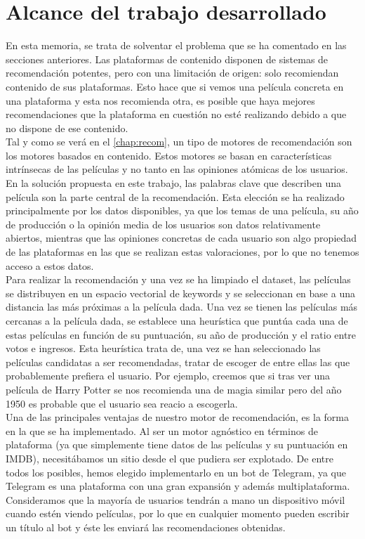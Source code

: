 \section{Alcance del trabajo desarrollado}\label{sec:trabajodesarrollado}

En esta memoria, se trata de solventar el problema que se ha comentado en las secciones anteriores. Las plataformas de contenido disponen de sistemas de recomendación potentes, pero con una limitación de origen: solo recomiendan contenido de sus plataformas. Esto hace que si vemos una película concreta en una plataforma y esta nos recomienda otra, es posible que haya mejores recomendaciones que la plataforma en cuestión no esté realizando debido a que no dispone de ese contenido.\\ 

Tal y como se verá en el \autoref{chap:recom}, un tipo de motores de recomendación son los motores basados en contenido. Estos motores se basan en características intrínsecas de las películas y no tanto en las opiniones atómicas de los usuarios. En la solución propuesta en este trabajo, las palabras clave que describen una película son la parte central de la recomendación. Esta elección se ha realizado principalmente por los datos disponibles, ya que los temas de una película, su año de producción o la opinión media de los usuarios son datos relativamente abiertos, mientras que las opiniones concretas de cada usuario son algo propiedad de las plataformas en las que se realizan estas valoraciones, por lo que no tenemos acceso a estos datos.\\ 

Para realizar la recomendación y una vez se ha limpiado el dataset, las películas se distribuyen en un espacio vectorial de keywords y se seleccionan en base a una distancia las más próximas a la película dada. Una vez se tienen las películas más cercanas a la película dada, se establece una heurística que puntúa cada una de estas películas en función de su puntuación, su año de producción y el ratio entre votos e ingresos. Esta heurística trata de, una vez se han seleccionado las películas candidatas a ser recomendadas, tratar de escoger de entre ellas las que probablemente prefiera el usuario. Por ejemplo, creemos que si tras ver una película de Harry Potter se nos recomienda una de magia similar pero del año 1950 es probable que el usuario sea reacio a escogerla.\\

Una de las principales ventajas de nuestro motor de recomendación, es la forma en la que se ha implementado. Al ser un motor agnóstico en términos de plataforma (ya que simplemente tiene datos de las películas y su puntuación en IMDB), necesitábamos un sitio desde el que pudiera ser explotado. De entre todos los posibles, hemos elegido implementarlo en un bot de Telegram, ya que Telegram es una plataforma con una gran expansión y además multiplataforma. Consideramos que la mayoría de usuarios tendrán a mano un dispositivo móvil cuando estén viendo películas, por lo que en cualquier momento pueden escribir un título al bot y éste les enviará las recomendaciones obtenidas.\\

